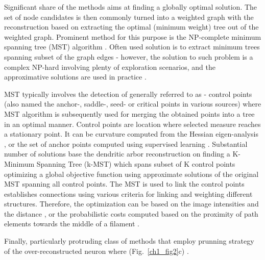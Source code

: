 Significant share of the methods aims at finding a globally optimal solution. The set of node candidates is then commonly turned into a weighted graph with the reconstruction based on extracting the optimal (minimum weight) tree out of the weighted graph. Prominent method for this purpose is the NP-complete minimum spanning tree (MST) algorithm \cite{turetken2011automated,yuan2009mdl,gonzalez2010delineating,xie2010automatic}. Often used solution is to extract minimum trees spanning subset of the graph edges - however, the solution to such problem is a complex NP-hard \cite{chimani2009obtaining} involving plenty of exploration scenarios, and the approximative solutions are used in practice \cite{blum2005combining,gonzalez2010delineating}.


MST typically involves the detection of generally referred to as - control points (also named the anchor-, saddle-, seed- or critical points in various sources) where MST algorithm is subsequently used for merging the obtained points into a tree in an optimal manner. Control points are location where selected measure reaches a stationary point. It can be curvature computed from the Hessian eigen-analysis \cite{yuan2009mdl}, or the set of anchor points computed using supervised learning \cite{turetken2011automated}. Substantial number of solutions \cite{gonzalez2010delineating,xie2010automatic,turetken2011automated} base the dendritic arbor reconstruction on finding a K-Minimum Spanning Tree (k-MST) which spans subset of K control points optimizing a global objective function using approximate solutions of the original MST spanning all control points. The MST is used to link the control points establishes connections using various criteria for linking and weighting different structures. Therefore, the optimization can be based on the image intensities and the distance \cite{yuan2009mdl}, or the probabilistic costs computed based on the proximity of path elements towards the middle of a filament \cite{turetken2011automated}.

Finally, particularly protruding class of methods that employ prunning strategy of the over-reconstructed neuron where  (Fig.~\ref{ch1_fig2}c) \cite{peng2011automatic}\cite{xiao2013app2}.

